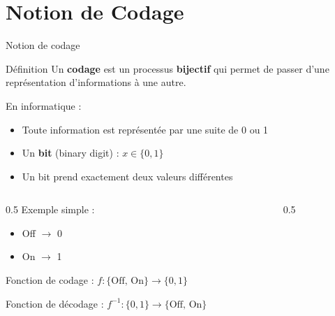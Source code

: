 \documentclass[aspectratio=1610]{beamer}
\begin{document}
\section{Notion de Codage}

\begin{frame}{Notion de codage}

  \begin{block}{Définition}
    Un \textbf{codage} est un processus \textbf{bijectif} qui permet de passer d'une représentation d'informations à une autre.
  \end{block}

  \vspace{0.5em}

  En informatique :
  \begin{itemize}
    \item Toute information est représentée par une suite de 0 ou 1
    \item Un \textbf{bit} (binary digit) : $x \in \{0,1\}$
    \item Un bit prend exactement deux valeurs différentes
  \end{itemize}

  \vspace{0.5em}

  \begin{columns}
    \begin{column}{0.5\textwidth}
      Exemple simple :
      \begin{itemize}
        \item Off $\rightarrow$ 0
        \item On $\rightarrow$ 1
      \end{itemize}

      Fonction de codage : $f: \{\text{Off, On}\} \rightarrow \{0,1\}$

      Fonction de décodage : $f^{-1}: \{0,1\} \rightarrow \{\text{Off, On}\}$
    \end{column}
    \begin{column}{0.5\textwidth}
      \centering
    \end{column}
  \end{columns}

\end{frame}
\end{document}
